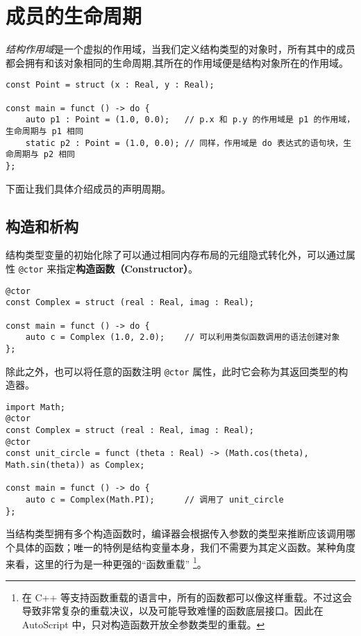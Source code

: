 \section{成员的生命周期}

\emph{结构作用域}是一个虚拟的作用域，当我们定义结构类型的对象时，所有其中的成员都会拥有和该对象相同的生命周期,其所在的作用域便是结构对象所在的作用域。

\begin{lstlisting}
const Point = struct (x : Real, y : Real);

const main = funct () -> do {
	auto p1 : Point = (1.0, 0.0);	// p.x 和 p.y 的作用域是 p1 的作用域，生命周期与 p1 相同
	static p2 : Point = (1.0, 0.0);	// 同样，作用域是 do 表达式的语句块，生命周期与 p2 相同
};
\end{lstlisting}

下面让我们具体介绍成员的声明周期。

\subsection{构造和析构}

结构类型变量的初始化除了可以通过相同内存布局的元组隐式转化外，可以通过属性 \lstinline!@ctor! 来指定\textbf{构造函数（Constructor）}。

\begin{lstlisting}
@ctor
const Complex = struct (real : Real, imag : Real);

const main = funct () -> do {
	auto c = Complex (1.0, 2.0);	// 可以利用类似函数调用的语法创建对象
};
\end{lstlisting}

除此之外，也可以将任意的函数注明 \lstinline!@ctor! 属性，此时它会称为其返回类型的构造器。

\begin{lstlisting}
import Math;
@ctor
const Complex = struct (real : Real, imag : Real);
@ctor
const unit_circle = funct (theta : Real) -> (Math.cos(theta), Math.sin(theta)) as Complex;

const main = funct () -> do {
	auto c = Complex(Math.PI);		// 调用了 unit_circle
};
\end{lstlisting}

当结构类型拥有多个构造函数时，编译器会根据传入参数的类型来推断应该调用哪个具体的函数；唯一的特例是结构变量本身，我们不需要为其定义函数。某种角度来看，这里的行为是一种更强的“函数重载” \footnote{在 C++ 等支持函数重载的语言中，所有的函数都可以像这样重载。不过这会导致非常复杂的重载决议，以及可能导致难懂的函数底层接口。因此在 AutoScript 中，只对构造函数开放全参数类型的重载。}。 \\

